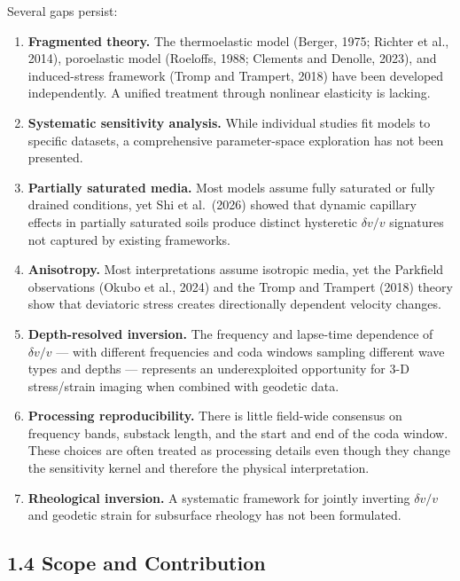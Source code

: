 \documentclass[draft]{agujournal2019}
\begin{document}
Several gaps persist:

\begin{enumerate}
\def\labelenumi{\arabic{enumi}.}
\item
  \textbf{Fragmented theory.} The thermoelastic model (Berger, 1975;
  Richter et al., 2014), poroelastic model (Roeloffs, 1988; Clements and
  Denolle, 2023), and induced-stress framework (Tromp and Trampert,
  2018) have been developed independently. A unified treatment through
  nonlinear elasticity is lacking.
\item
  \textbf{Systematic sensitivity analysis.} While individual studies fit
  models to specific datasets, a comprehensive parameter-space
  exploration has not been presented.
\item
  \textbf{Partially saturated media.} Most models assume fully saturated
  or fully drained conditions, yet Shi et al.~(2026) showed that dynamic
  capillary effects in partially saturated soils produce distinct
  hysteretic \(\delta v/v\) signatures not captured by existing
  frameworks.
\item
  \textbf{Anisotropy.} Most interpretations assume isotropic media, yet
  the Parkfield observations (Okubo et al., 2024) and the Tromp and
  Trampert (2018) theory show that deviatoric stress creates
  directionally dependent velocity changes.
\item
  \textbf{Depth-resolved inversion.} The frequency and lapse-time
  dependence of \(\delta v/v\) --- with different frequencies and coda
  windows sampling different wave types and depths --- represents an
  underexploited opportunity for 3-D stress/strain imaging when combined
  with geodetic data.
\item
  \textbf{Processing reproducibility.} There is little field-wide
  consensus on frequency bands, substack length, and the start and end
  of the coda window. These choices are often treated as processing
  details even though they change the sensitivity kernel and therefore
  the physical interpretation.
\item
  \textbf{Rheological inversion.} A systematic framework for jointly
  inverting \(\delta v/v\) and geodetic strain for subsurface rheology
  has not been formulated.
\end{enumerate}

\subsection{1.4 Scope and Contribution}\label{scope-and-contribution}
\end{document}
